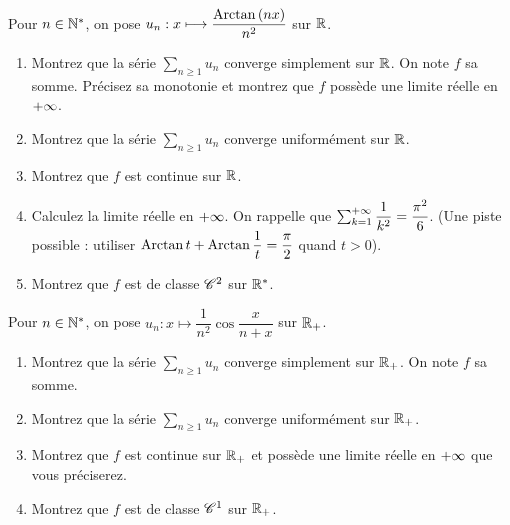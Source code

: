 \begin{exoss}
Pour \(n\in\mathbb{N}^*\), on pose \(u_n:x\longmapsto\dfrac{\operatorname{Arctan}\left(nx\right)}{n^2}\) sur \(\mathbb{R}\).

\begin{enumerate}
    \item Montrez que la série \(\sum_{n\geq1}u_n\) converge simplement sur \(\mathbb{R}\). On note \(f\) sa somme. Précisez sa monotonie et montrez que \(f\) possède une limite réelle en \(+\infty\). \\
    \item Montrez que la série \(\sum_{n\geq1}u_n\) converge uniformément sur \(\mathbb{R}\). \\
    \item Montrez que \(f\) est continue sur \(\mathbb{R}\). \\
    \item Calculez la limite réelle en \(+\infty\). On rappelle que \(\sum_{k=1}^{+\infty}\dfrac{1}{k^2}=\dfrac{\pi^2}{6}\). (Une piste possible : utiliser \(\operatorname{Arctan} t+\operatorname{Arctan}\dfrac{1}{t}=\dfrac{\pi}{2}\) quand \(t>0\)). \\
    \item Montrez que \(f\) est de classe \(\mathscr{C}^{2}\) sur \(\mathbb{R}^*\).
\end{enumerate}
\end{exoss}

\begin{exoss}
Pour \(n\in\mathbb{N}^*\), on pose \(u_n:x\mapsto\dfrac{1}{n^2}\cos\dfrac{x}{n+x}\) sur \(\mathbb{R}_+\).

\begin{enumerate}
    \item Montrez que la série \(\sum_{n\geq1}u_n\) converge simplement sur \(\mathbb{R}_+\). On note \(f\) sa somme. \\
    \item Montrez que la série \(\sum_{n\geq1}u_n\) converge uniformément sur \(\mathbb{R}_+\). \\
    \item Montrez que \(f\) est continue sur \(\mathbb{R}_+\) et possède une limite réelle en \(+\infty\) que vous préciserez. \\
    \item Montrez que \(f\) est de classe \(\mathscr{C}^{1}\) sur \(\mathbb{R}_+\).
\end{enumerate}
\end{exoss}

